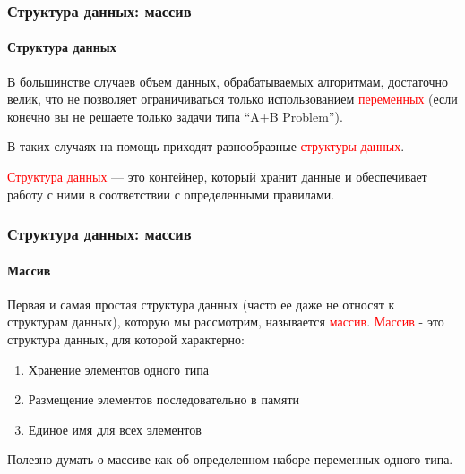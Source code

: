 \documentclass[aspectratio=169]{beamer}
\begin{document}
\begin{frame}
\frametitle{Структура данных: массив}
\framesubtitle{Структура данных}
\justifying

В большинстве случаев объем данных, обрабатываемых алгоритмам, достаточно велик, что не позволяет ограничиваться только использованием \textcolor{red}{переменных} (если конечно вы не решаете только задачи типа “A+B Problem”).\newline\newline

В таких случаях на помощь приходят разнообразные \textcolor{red}{структуры данных}.\newline\newline

\textcolor{red}{Структура данных} — это контейнер, который хранит данные и обеспечивает работу с ними в соответствии с определенными правилами.\newline\newline

\end{frame}

\begin{frame}
\frametitle{Структура данных: массив}
\framesubtitle{Массив}
\justifying
Первая и самая простая структура данных (часто ее даже не относят к структурам данных), которую мы рассмотрим, называется \textcolor{red}{массив}.\newline\newline
\textcolor{red}{Массив} - это структура данных, для которой характерно:
\begin{enumerate}
  \item{Хранение элементов одного типа}
  \item{Размещение элементов последовательно в памяти}
  \item{Единое имя для всех элементов\newline}
\end{enumerate}
Полезно думать о массиве как об определенном наборе переменных одного типа.

\end{frame}
\end{document}
